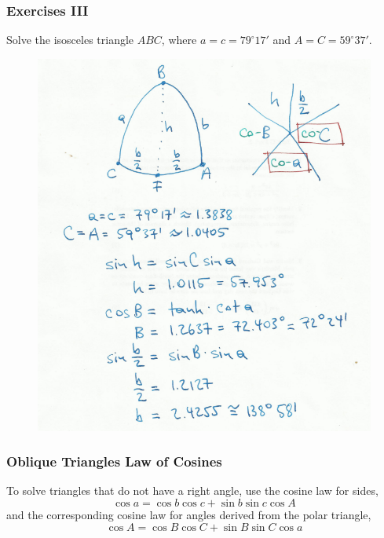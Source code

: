 \documentclass[xcolor=dvipsnames]{beamer}
\begin{document}
\begin{frame}
  \frametitle{Exercises III}
  Solve the isosceles triangle $ABC$, where $a=c=79^{\circ}17'$ and
  $A=C=59^{\circ}37'$.
\begin{figure}[h]
\includegraphics[scale=.25]{./gm-CliffordBell-p135-solution}
\end{figure}
\end{frame}

\begin{frame}
  \frametitle{Oblique Triangles Law of Cosines}
To solve triangles that do not have a right angle, use the cosine law
for sides,
\begin{equation}
  \label{eq:epheepee}
  \cos{}a=\cos{}b\cos{}c+\sin{}b\sin{}c\cos{}A
\end{equation}
and the corresponding cosine law for angles derived from the polar
triangle,
\begin{equation}
  \label{eq:dijeeghe}
  \cos{}A=\cos{}B\cos{}C+\sin{}B\sin{}C\cos{}a
\end{equation}
\end{frame}
\end{document}
